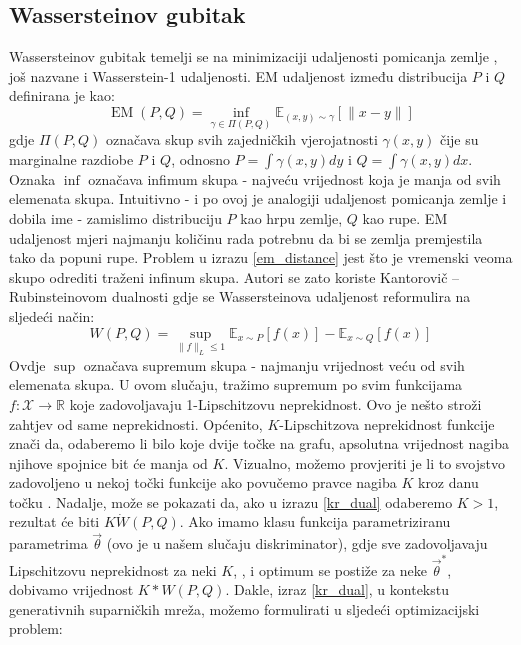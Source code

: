 \subsection{Wassersteinov gubitak}
Wassersteinov gubitak  temelji se na minimizaciji udaljenosti pomicanja zemlje , još nazvane i Wasserstein-1 udaljenosti. EM udaljenost između distribucija $P$ i $Q$ definirana je kao:
\begin{equation}
\label{em_distance}
\operatorname*{EM}(P, Q) = \inf_{\gamma \in \Pi(P, Q)} \mathbb{E}_{(x, y) \sim \gamma} \left[ \|x - y\|\right]
\end{equation}
gdje $\Pi(P, Q)$ označava skup svih zajedničkih vjerojatnosti $\gamma(x, y)$ čije su marginalne razdiobe $P$ i $Q$, odnosno $P = \int \gamma(x, y)dy$ i $Q = \int \gamma(x, y)dx$. Oznaka $\inf$ označava infimum skupa - najveću vrijednost koja je manja od svih elemenata skupa. Intuitivno - i po ovoj je analogiji udaljenost pomicanja zemlje i dobila ime - zamislimo distribuciju $P$ kao hrpu zemlje, $Q$ kao rupe. EM udaljenost mjeri najmanju količinu rada potrebnu da bi se zemlja premjestila tako da popuni rupe.  
Problem u izrazu \ref{em_distance} jest što je vremenski veoma skupo odrediti traženi infinum skupa. Autori se zato koriste Kantorovič -- Rubinsteinovom dualnosti gdje se Wassersteinova udaljenost reformulira na sljedeći način:
\begin{equation}
\label{kr_dual}
W(P, Q) = \sup_{\|f\|_L \leq 1} \mathbb{E}_{x \sim P} \left[f(x)\right] - \mathbb{E}_{x \sim Q}\left[f(x)\right]
\end{equation}
Ovdje $\sup$ označava supremum skupa - najmanju vrijednost veću od svih elemenata skupa. U ovom slučaju, tražimo supremum po svim funkcijama $f : \mathcal{X} \rightarrow \mathbb{R}$ koje zadovoljavaju 1-Lipschitzovu neprekidnost. Ovo je nešto stroži zahtjev od same neprekidnosti. Općenito, $K$-Lipschitzova neprekidnost  funkcije znači da, odaberemo li bilo koje dvije točke na grafu, apsolutna vrijednost nagiba njihove spojnice bit će manja od $K$. Vizualno, možemo provjeriti je li to svojstvo zadovoljeno u nekoj točki funkcije ako povučemo pravce nagiba $K$ kroz danu točku  . Nadalje, može se pokazati da, ako u izrazu \ref{kr_dual} odaberemo $K > 1$, rezultat će biti $K\dot W(P, Q)$. Ako imamo klasu funkcija parametriziranu parametrima $\vec{\theta}$ (ovo je u našem slučaju diskriminator), gdje sve zadovoljavaju Lipschitzovu neprekidnost za neki $K$, , i optimum se postiže za neke $\vec{\theta}^*$, dobivamo vrijednost $K * W(P, Q)$. Dakle, izraz \ref{kr_dual}, u kontekstu generativnih suparničkih mreža, možemo formulirati u sljedeći optimizacijski problem:
